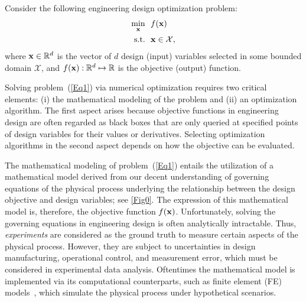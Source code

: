 \documentclass[iicol,sn-basic]{sn-jnl}%
\begin{document}
Consider the following engineering design optimization problem:
\begin{equation}\label{Eq1}
	\begin{aligned}
		\underset{\bf x}{\min} \ \ & f(\bf x)\\
		\textrm{s.t.} \ \ 
		& \bf x \in \mathcal{X}, 
	\end{aligned}
\end{equation} 
where ${\bf x} \in \mathbb{R}^d$ is the vector of $d$ design (input) variables selected in some bounded domain $\mathcal{X}$, and $f({\bf x}):\mathbb{R}^d \mapsto \mathbb{R}$ is the objective (output) function.

Solving problem~(\ref{Eq1}) via numerical optimization requires two critical elements: (i) the mathematical modeling of the problem and (ii) an optimization algorithm.
The first aspect arises because objective functions in engineering design are often regarded as black boxes that are only queried at specified points of design variables for their values or derivatives.
Selecting optimization algorithms in the second aspect depends on how the objective can be evaluated. 

The mathematical modeling of problem~(\ref{Eq1}) entails the utilization of a mathematical model derived from our decent understanding of governing equations of the physical process underlying the relationship between the design objective and design variables; see \cref{Fig0}.
The expression of this mathematical model is, therefore, the objective function $f(\bf x)$.
Unfortunately, solving the governing equations in engineering design is often analytically intractable.
Thus, \textit{experiments} are considered as the ground truth to measure certain aspects of the physical process.
However, they are subject to uncertainties in design manufacturing, operational control, and measurement error, which must be considered in experimental data analysis.
Oftentimes the mathematical model is implemented via its computational counterparts, such as finite element (FE) models~\citep{Bathe2006}, which simulate the physical process under hypothetical scenarios.
\end{document}
